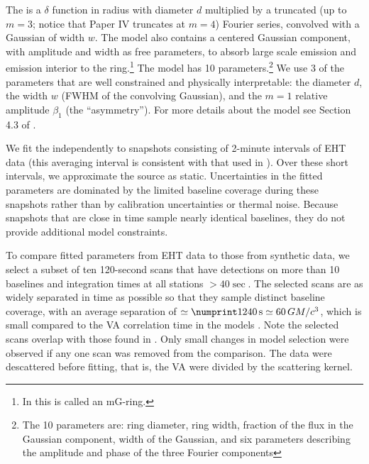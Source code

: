 The \mring is a $\delta$ function in radius with diameter $d$ multiplied by a truncated (up to $m = 3$; notice that Paper IV truncates at $m = 4$) Fourier series, convolved with a Gaussian of width $w$.
The model also contains a centered Gaussian component, with amplitude and width as free parameters, to absorb large scale emission and emission interior to the ring.\footnote{In  this is called an mG-ring.}
The \mring model has 10 parameters.\footnote{The 10 parameters are: ring diameter, ring width, fraction of the flux in the Gaussian component, width of the Gaussian, and six parameters describing the amplitude and phase of the three Fourier components} We use 3 of the parameters that are well constrained and physically interpretable: the \mring diameter $d$, the \mring width $w$ (FWHM of the convolving Gaussian), and the $m=1$ relative amplitude $\beta_1$ (the ``asymmetry'').  For more details about the \mring model see Section 4.3 of .

We fit the \mring independently to snapshots consisting of 2-minute intervals of EHT data (this averaging interval is consistent with that used in ).
Over these short intervals, we approximate the source as static.
Uncertainties in the fitted \mring parameters are dominated by the limited baseline coverage during these snapshots rather than by calibration uncertainties or thermal noise.
Because snapshots that are close in time sample nearly identical baselines, they do not provide additional model constraints.

To compare fitted \mring parameters from EHT data to those from  synthetic data, we select a subset of ten 120-second scans  that have detections on more than 10 baselines and integration times at all stations $> 40\sec$.
The selected scans are as widely separated in time as possible so that they sample distinct baseline coverage, with an average separation of $\simeq \no{1240}\sec \simeq 60 \,\tg$, which is small compared to the VA correlation time in the models \citep{Georgiev_2022}.
Note the selected scans overlap with those found in \cite{Farah_2022}.
Only small changes in model selection were observed if any one scan was removed from the comparison.
The data were descattered before fitting, that is, the VA were divided by the scattering kernel.


